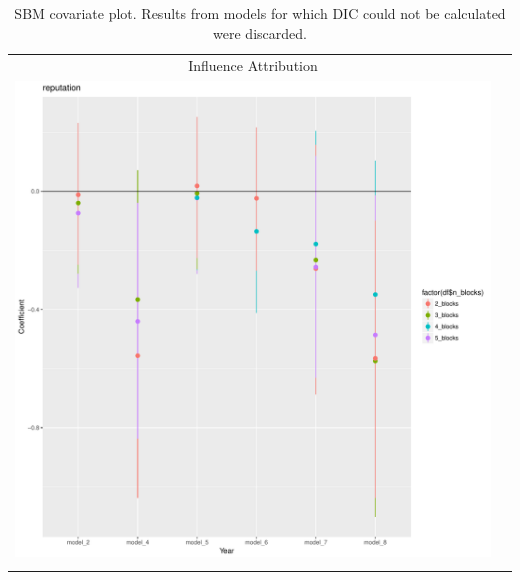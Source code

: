 \documentclass[fleqn,12pt]{wlscirep}
\begin{document}
\clearpage
\begin{longtable}[!h]{c@{\hskip 0cm}c}
Influence Attribution \\
\includegraphics[height=.75\textheight, clip=true, trim=.5cm .5cm 0cm .6cm]{figures/rl_plots2/reputation.pdf}   \\
\caption{\label{fig:SBM_plot_reputation} SBM covariate plot. Results from models for which DIC could not be calculated were discarded.}
\end{longtable}
\end{document}

